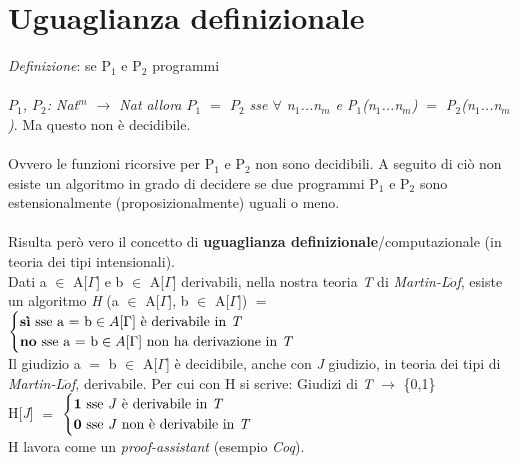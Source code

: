 \section{Uguaglianza definizionale}
\label{sec: uguaglianza-definizionale}
\textit{Definizione}: se P$_1$ e P$_2$ programmi\\\\
\textit{$P_1$, $P_2$: Nat$^m$  $\rightarrow$ Nat \quad allora \quad
$P_1$ $=$ $P_2$ sse $\forall$ n$_1$...n$_m$ e P$_1$(n$_1$...n$_m$) $=$ P$_2$(n$_1$...n$_m$)}. Ma questo non \`e decidibile.\\\\
Ovvero le funzioni ricorsive per P$_1$ e P$_2$ non sono decidibili. A seguito di ci\`o non esiste un algoritmo in grado di decidere se due programmi P$_1$ e P$_2$ sono estensionalmente (proposizionalmente) uguali o meno.\\\\
Risulta per\`o vero il concetto di \textbf{uguaglianza definizionale}/computazionale (in teoria dei tipi intensionali). \\Dati a $\in$ A[$\Gamma$] e b $\in$ A[$\Gamma$] derivabili, nella nostra teoria \textit{T} di \textit{Martin-L$\ddot{o}$f}, esiste un algoritmo \textit{H} (a $\in$ A[$\Gamma$], b $\in$ A[$\Gamma$]) $=$
$
\begin{cases}
\text{\textbf{sì} sse a \text{=} b} \in A[\Gamma]  \text{ è derivabile in \textit{T}} \\
\text{\textbf{no} sse a \text{=} b} \in A[\Gamma] \text{ non ha derivazione in \textit{T}}
\end{cases}
$
\\
Il giudizio a $=$ b $\in$ A[$\Gamma$] \`e decidibile, anche con \textit{J} giudizio, in teoria dei tipi di \textit{Martin-L$\ddot{o}$f}, derivabile. Per cui con H si scrive: Giudizi di \textit{T} $\rightarrow$ \{0,1\}\\
H[\textit{J}] $=$
$
\begin{cases}
\textbf{1} \text{ sse \textit{J} è derivabile in \textit{T}}  \\
\textbf{0} \text{ sse \textit{J} non è derivabile in \textit{T}}
\end{cases}
$
\\
H lavora come un \textit{proof-assistant} (esempio \textit{Coq}).\\\\
\noindent

